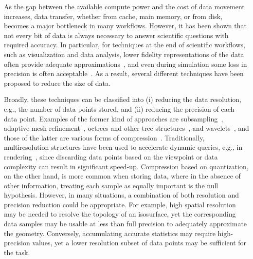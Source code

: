 As the gap between the available compute power and the cost of data movement increases, data
transfer, whether from cache, main memory, or from disk, becomes a major bottleneck in many
workflows. However, it has been shown that not every bit of data is always necessary to answer
scientific questions with required accuracy. In particular, for techniques at the end of scientific
workflows, such as visualization and data analysis, lower fidelity representations of the data often
provide adequate approximations~\cite{woodring2011,covra2012,compression_sim2013}, and even during
simulation some loss in precision is often
acceptable~\cite{compression_sim2013,doi:10.1177/1094342018762036}. As a result, several different
techniques have been proposed to reduce the size of data. 

Broadly, these techniques can be classified into (i) reducing the data resolution, e.g., the number
of data points stored, and (ii) reducing the precision of each data point. Examples of the former
kind of approaches are subsampling~\cite{idx2001}, adaptive mesh refinement~\cite{amr1989}, octrees
and other tree structures~\cite{hierarchical1984}, and wavelets~\cite{woodring2011}, and those of
the latter are various forms of
compression~\cite{fpzip,isabela,zfp2014,sz,vq1992,compression_domain2003,sqe}. Traditionally,
multiresolution structures have been used to accelerate dynamic queries, e.g., in
rendering~\cite{multires_octree1999}, since discarding data points based on the viewpoint or data
complexity can result in significant speed-up. Compression based on quantization, on the other hand,
is more common when storing data, where in the absence of other information, treating each sample as
equally important is the null hypothesis. However, in many situations, a combination of both
resolution and precision reduction could be appropriate. For example, high spatial resolution may be
needed to resolve the topology of an isosurface, yet the corresponding data samples may be usable at
less than full precision to adequately approximate the geometry. Conversely, accumulating accurate
statistics may require high-precision values, yet a lower resolution subset of data points may be
sufficient for the task. 


